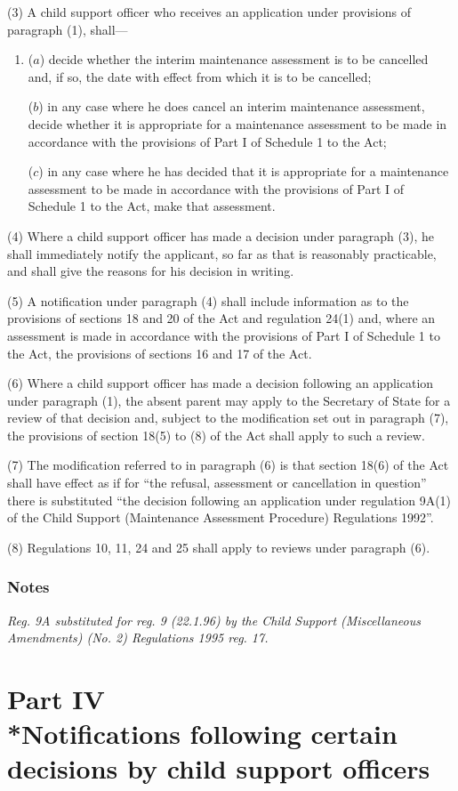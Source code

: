 \documentclass[a4paper]{article}
\newcommand\amendment[1]{\subsubsection*{Notes}{\itshape\frenchspacing\footnotesize #1 \par}}
\begin{document}
(3) A child support officer who receives an application under provisions of paragraph (1), shall—
\begin{enumerate}\item[]
($a$) decide whether the interim maintenance assessment is to be cancelled and, if so, the date with effect from which it is to be cancelled;

($b$) in any case where he does cancel an interim maintenance assessment, decide whether it is appropriate for a maintenance assessment to be made in accordance with the provisions of Part I of Schedule 1 to the Act;

($c$) in any case where he has decided that it is appropriate for a maintenance assessment to be made in accordance with the provisions of Part I of Schedule 1 to the Act, make that assessment.
\end{enumerate}

(4) Where a child support officer has made a decision under paragraph (3), he shall immediately notify the applicant, so far as that is reasonably practicable, and shall give the reasons for his decision in writing.

(5) A notification under paragraph (4) shall include information as to the provisions of sections 18 and 20 of the Act and regulation 24(1) and, where an assessment is made in accordance with the provisions of Part I of Schedule 1 to the Act, the provisions of sections 16 and 17 of the Act.

(6) Where a child support officer has made a decision following an application under paragraph (1), the absent parent may apply to the Secretary of State for a review of that decision and, subject to the modification set out in paragraph (7), the provisions of section 18(5) to (8) of the Act shall apply to such a review.

(7) The modification referred to in paragraph (6) is that section 18(6) of the Act shall have effect as if for “the refusal, assessment or cancellation in question” there is substituted “the decision following an application under regulation 9A(1) of the Child Support (Maintenance Assessment Procedure) Regulations 1992”.

(8) Regulations 10, 11, 24 and 25 shall apply to reviews under paragraph (6).

\amendment{
Reg. 9A substituted for reg. 9 (22.1.96) by the Child Support (Miscellaneous Amendments) (No. 2) Regulations 1995 reg. 17.
}

\section[Part IV --- Notifications following certain decisions by child support officers]{\sloppy Part IV\\*Notifications following certain decisions by child support officers}
\end{document}

